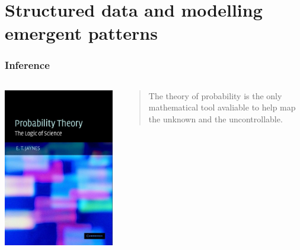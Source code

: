 \documentclass{beamer}
\begin{document}
\section{Structured data and modelling emergent patterns}

\begin{frame}
  \frametitle{Inference}
  \begin{columns}
    \begin{column}{0.45\textwidth}
      \begin{center}
        \includegraphics[width = \textwidth,height = 0.8\textheight,keepaspectratio = true]{figure/jaynes_theory}
      \end{center}
    \end{column}
    \begin{column}{0.55\textwidth}
      \begin{quote}
        The theory of probability is the only mathematical tool avaliable to help map the unknown and the uncontrollable.
      \end{quote}
      \tiny{}
    \end{column}
  \end{columns}
\end{frame}
\end{document}
